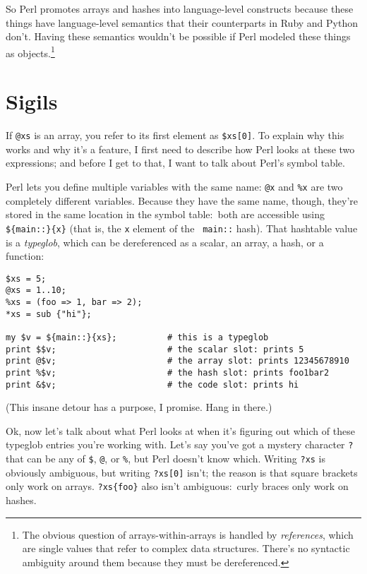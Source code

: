 \documentclass{article}
\begin{document}
So Perl promotes arrays and hashes into language-level constructs because these
things have language-level semantics that their counterparts in Ruby and Python
don't. Having these semantics wouldn't be possible if Perl modeled these things
as objects.\footnote{The obvious question of arrays-within-arrays is handled by
{\em references}, which are single values that refer to complex data
structures. There's no syntactic ambiguity around them because they must be
dereferenced.}

\section{Sigils}

If \verb|@xs| is an array, you refer to its first element as \verb|$xs[0]|. To
explain why this works and why it's a feature, I first need to describe how
Perl looks at these two expressions; and before I get to that, I want to talk
about Perl's symbol table.

Perl lets you define multiple variables with the same name: \verb|@x| and
\verb|%x| are two completely different variables. Because they have the same
name, though, they're stored in the same location in the symbol table:~both are
accessible using \verb|${main::}{x}| (that is, the {\tt x} element of the {\tt
main::} hash). That hashtable value is a {\em typeglob}, which can be
dereferenced as a scalar, an array, a hash, or a function:

\begin{verbatim}
$xs = 5;
@xs = 1..10;
%xs = (foo => 1, bar => 2);
*xs = sub {"hi"};

my $v = ${main::}{xs};          # this is a typeglob
print $$v;                      # the scalar slot: prints 5
print @$v;                      # the array slot: prints 12345678910
print %$v;                      # the hash slot: prints foo1bar2
print &$v;                      # the code slot: prints hi
\end{verbatim}

(This insane detour has a purpose, I promise. Hang in there.)

Ok, now let's talk about what Perl looks at when it's figuring out which of
these typeglob entries you're working with. Let's say you've got a mystery
character \verb|?| that can be any of \verb|$|, \verb|@|, or \verb|%|, but Perl
doesn't know which. Writing \verb|?xs| is obviously ambiguous, but writing
\verb|?xs[0]| isn't; the reason is that square brackets only work on arrays.
\verb|?xs{foo}| also isn't ambiguous:~curly braces only work on hashes.
\end{document}
